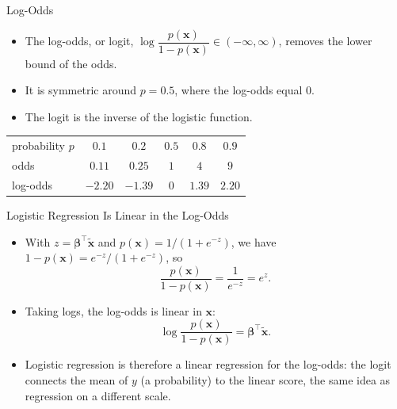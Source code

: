 \begin{frame}{Log-Odds}
    \begin{itemize}
        \item The log-odds, or logit, $\log \dfrac{p(\mathbf{x})}{1 - p(\mathbf{x})} \in (-\infty, \infty)$, removes the lower bound of the odds.
        \item It is symmetric around $p = 0.5$, where the log-odds equal $0$.
        \item The logit is the inverse of the logistic function.
    \end{itemize}
    \begin{center}
        {\small
        \renewcommand{\arraystretch}{1.15}
        \begin{tabular}{lccccc}
        \toprule
        probability $p$ & $0.1$ & $0.2$ & $0.5$ & $0.8$ & $0.9$ \\
        odds & $0.11$ & $0.25$ & $1$ & $4$ & $9$ \\
        log-odds & $-2.20$ & $-1.39$ & $0$ & $1.39$ & $2.20$ \\
        \bottomrule
        \end{tabular}
        }
    \end{center}
\end{frame}


\begin{frame}{Logistic Regression Is Linear in the Log-Odds}
    \begin{itemize}
        \item With $z = \symbf{\beta}^\top \tilde{\mathbf{x}}$ and $p(\mathbf{x}) = 1 / (1 + e^{-z})$, we have $1 - p(\mathbf{x}) = e^{-z} / (1 + e^{-z})$, so
        \[
            \frac{p(\mathbf{x})}{1 - p(\mathbf{x})} = \frac{1}{e^{-z}} = e^{z}.
        \]
        \item Taking logs, the log-odds is linear in $\mathbf{x}$:
        \[
            \log \frac{p(\mathbf{x})}{1 - p(\mathbf{x})} = \symbf{\beta}^\top \tilde{\mathbf{x}}.
        \]
        \item Logistic regression is therefore a linear regression for the log-odds: the logit connects the mean of $y$ (a probability) to the linear score, the same idea as regression on a different scale.
    \end{itemize}
\end{frame}


